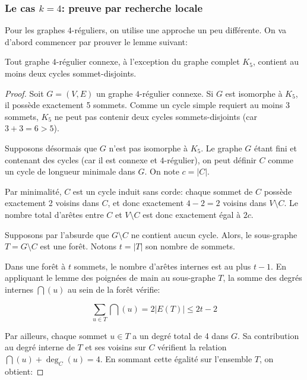 \subsubsection{Le cas \(k=4\): preuve par recherche locale}

Pour les graphes \(4\)-réguliers, on utilise une approche un peu différente.
On va d'abord commencer par prouver le lemme suivant:

\begin{lemma}
    Tout graphe \(4\)-régulier connexe, à l'exception du graphe complet \(K_5\), contient au moins deux cycles sommet-disjoints.
\end{lemma}

\begin{proof}
    Soit \(G=(V,E)\) un graphe \(4\)-régulier connexe.
    Si \(G\) est isomorphe à \(K_5\), il possède exactement 5 sommets. 
    Comme un cycle simple requiert au moins 3 sommets, \(K_5\) ne peut pas contenir deux cycles sommets-disjoints (car \(3 + 3 = 6 > 5\)).

    Supposons désormais que \(G\) n'est pas isomorphe à \(K_5\). 
    Le graphe \(G\) étant fini et contenant des cycles (car il est connexe et \(4\)-régulier), on peut définir \(C\) comme un cycle de longueur minimale dans \(G\). 
    On note \(c = |C|\).

    Par minimalité, \(C\) est un cycle induit sans corde: chaque sommet de \(C\) possède exactement 2 voisins dans \(C\), et donc exactement \(4 - 2 = 2\) voisins dans \(V \setminus C\). 
    Le nombre total d'arêtes entre \(C\) et \(V \setminus C\) est donc exactement égal à \(2c\).

    Supposons par l'absurde que \(G \setminus C\) ne contient aucun cycle. 
    Alors, le sous-graphe \(T = G \setminus C\) est une forêt. Notons \(t = |T|\) son nombre de sommets.

    Dans une forêt à \(t\) sommets, le nombre d'arêtes internes est au plus \(t - 1\). 
    En appliquant le lemme des poignées de main au sous-graphe \(T\), la somme des degrés internes \(\dint(u)\) au sein de la forêt vérifie:

    \begin{equation}\label{eq:somme_foret}
        \sum_{u \in T} \dint(u) = 2|E(T)| \leq 2t - 2
    \end{equation}

    Par ailleurs, chaque sommet \(u \in T\) a un degré total de 4 dans \(G\). 
    Sa contribution au degré interne de \(T\) et ses voisins sur \(C\) vérifient la relation \(\dint(u) + \deg_C(u) = 4\). 
    En sommant cette égalité sur l'ensemble \(T\), on obtient:


\end{proof}
